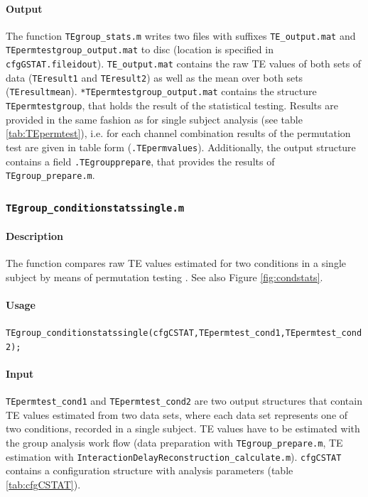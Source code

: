 \documentclass[a4paper,10pt]{article}
\begin{document}
\paragraph*{Output} The function \texttt{TEgroup\_stats.m} writes two files with suffixes \texttt{TE\_output.mat} and \texttt{TEpermtestgroup\_output.mat} to disc (location is specified in \texttt{cfgGSTAT.fileidout}). \texttt{TE\_output.mat} contains the raw TE values of both sets of data (\texttt{TEresult1} and \texttt{TEresult2}) as well as the mean over both sets (\texttt{TEresultmean}). \texttt{*TEpermtestgroup\_output.mat} contains the structure \texttt{TEpermtestgroup}, that holds the result of the statistical testing. Results are provided in the same fashion as for single subject analysis (see table \ref{tab:TEpermtest}), i.e. for each channel combination results of the permutation test are given in table form (\texttt{.TEpermvalues}). Additionally, the output structure contains a field \texttt{.TEgroupprepare}, that provides the results of \texttt{TEgroup\_prepare.m}.

\subsubsection{\texttt{TEgroup\_conditionstatssingle.m}}

\paragraph*{Description} The function compares raw TE values estimated for two conditions in a single subject by means of permutation testing \cite{maris2007,lindner2011}. See also Figure \ref{fig:condstats}.

\paragraph*{Usage} \verb&TEgroup_conditionstatssingle(cfgCSTAT,TEpermtest_cond1,TEpermtest_cond2);& 

\paragraph*{Input} \verb&TEpermtest_cond1& and \verb&TEpermtest_cond2& are two output structures that contain TE values estimated from two data sets, where each data set represents one of two conditions, recorded in a single subject. TE values have to be estimated with the group analysis work flow (data preparation with \texttt{TEgroup\_prepare.m}, TE estimation with \verb&InteractionDelayReconstruction_calculate.m&). \verb&cfgCSTAT& contains a configuration structure with analysis parameters (table \ref{tab:cfgCSTAT}).
\end{document}
